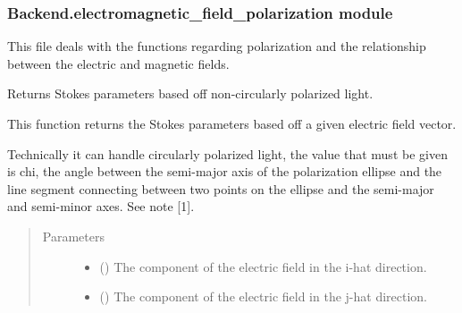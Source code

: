 \documentclass[letterpaper,10pt,english]{sphinxmanual}
\begin{document}
\subsubsection{Backend.electromagnetic\_field\_polarization module}
\label{\detokenize{Backend.electromagnetic_field_polarization:module-Backend.electromagnetic_field_polarization}}\label{\detokenize{Backend.electromagnetic_field_polarization:backend-electromagnetic-field-polarization-module}}\label{\detokenize{Backend.electromagnetic_field_polarization::doc}}
This file deals with the functions regarding polarization and the
relationship between the electric and magnetic fields.

\begin{fulllineitems}
\label{\detokenize{Backend.electromagnetic_field_polarization:Backend.electromagnetic_field_polarization.Stokes_parameters_from_field}}
Returns Stokes parameters based off non-circularly polarized light.

This function returns the Stokes parameters based off a given
electric field vector.

Technically it can handle circularly polarized light, the value that
must be given is chi, the angle between the semi-major axis of the
polarization ellipse and the line segment connecting between two points
on the ellipse and the semi-major and semi-minor axes. See note {[}1{]}.
\begin{quote}\begin{description}
\item[{Parameters}] \leavevmode\begin{itemize}
\item {} 
 () \textendash{} The component of the electric field in the i-hat direction.

\item {} 
 () \textendash{} The component of the electric field in the j-hat direction.


\end{itemize}
\end{description}
\end{quote}
\end{fulllineitems}
\end{document}

